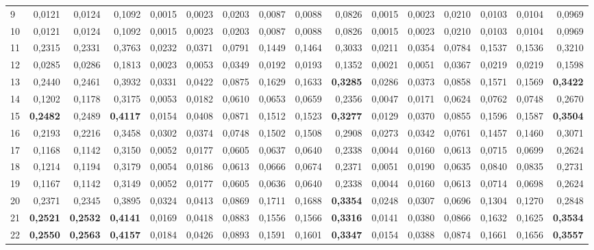 \begin{table}[htp!]
\begin{adjustwidth}{-2cm}{}
\begin{tabular}{ l | *{15}{| r}}
9	&	0,0121	&	0,0124	&	0,1092	&	0,0015	&	0,0023	&	0,0203	&	0,0087	&	0,0088	&	0,0826	&	0,0015	&	0,0023	&	0,0210	&	0,0103	&	0,0104	&	0,0969	\\
10	&	0,0121	&	0,0124	&	0,1092	&	0,0015	&	0,0023	&	0,0203	&	0,0087	&	0,0088	&	0,0826	&	0,0015	&	0,0023	&	0,0210	&	0,0103	&	0,0104	&	0,0969	\\
11	&	0,2315	&	0,2331	&	0,3763	&	0,0232	&	0,0371	&	0,0791	&	0,1449	&	0,1464	&	0,3033	&	0,0211	&	0,0354	&	0,0784	&	0,1537	&	0,1536	&	0,3210	\\
12	&	0,0285	&	0,0286	&	0,1813	&	0,0023	&	0,0053	&	0,0349	&	0,0192	&	0,0193	&	0,1352	&	0,0021	&	0,0051	&	0,0367	&	0,0219	&	0,0219	&	0,1598	\\
13	&	0,2440	&	0,2461	&	0,3932	&	0,0331	&	0,0422	&	0,0875	&	0,1629	&	0,1633	&	\textbf{0,3285}	&	0,0286	&	0,0373	&	0,0858	&	0,1571	&	0,1569	&	\textbf{0,3422}	\\
14	&	0,1202	&	0,1178	&	0,3175	&	0,0053	&	0,0182	&	0,0610	&	0,0653	&	0,0659	&	0,2356	&	0,0047	&	0,0171	&	0,0624	&	0,0762	&	0,0748	&	0,2670	\\
15	&	\textbf{0,2482}	&	0,2489	&	\textbf{0,4117}	&	0,0154	&	0,0408	&	0,0871	&	0,1512	&	0,1523	&	\textbf{0,3277}	&	0,0129	&	0,0370	&	0,0855	&	0,1596	&	0,1587	&	\textbf{0,3504}	\\
16	&	0,2193	&	0,2216	&	0,3458	&	0,0302	&	0,0374	&	0,0748	&	0,1502	&	0,1508	&	0,2908	&	0,0273	&	0,0342	&	0,0761	&	0,1457	&	0,1460	&	0,3071	\\
17	&	0,1168	&	0,1142	&	0,3150	&	0,0052	&	0,0177	&	0,0605	&	0,0637	&	0,0640	&	0,2338	&	0,0044	&	0,0160	&	0,0613	&	0,0715	&	0,0699	&	0,2624	\\
18	&	0,1214	&	0,1194	&	0,3179	&	0,0054	&	0,0186	&	0,0613	&	0,0666	&	0,0674	&	0,2371	&	0,0051	&	0,0190	&	0,0635	&	0,0840	&	0,0835	&	0,2731	\\
19	&	0,1167	&	0,1142	&	0,3149	&	0,0052	&	0,0177	&	0,0605	&	0,0636	&	0,0640	&	0,2338	&	0,0044	&	0,0160	&	0,0613	&	0,0714	&	0,0698	&	0,2624	\\
20	&	0,2371	&	0,2345	&	0,3895	&	0,0324	&	0,0413	&	0,0869	&	0,1711	&	0,1688	&	\textbf{0,3354}	&	0,0248	&	0,0307	&	0,0696	&	0,1304	&	0,1270	&	0,2848	\\
21	&	\textbf{0,2521}	&	\textbf{0,2532}	&	\textbf{0,4141}	&	0,0169	&	0,0418	&	0,0883	&	0,1556	&	0,1566	&	\textbf{0,3316}	&	0,0141	&	0,0380	&	0,0866	&	0,1632	&	0,1625	&	\textbf{0,3534}	\\
22	&	\textbf{0,2550}	&	\textbf{0,2563}	&	\textbf{0,4157}	&	0,0184	&	0,0426	&	0,0893	&	0,1591	&	0,1601	&	\textbf{0,3347}	&	0,0154	&	0,0388	&	0,0874	&	0,1661	&	0,1656	&	\textbf{0,3557}	\\

\end{tabular}
\end{adjustwidth}
\end{table}
